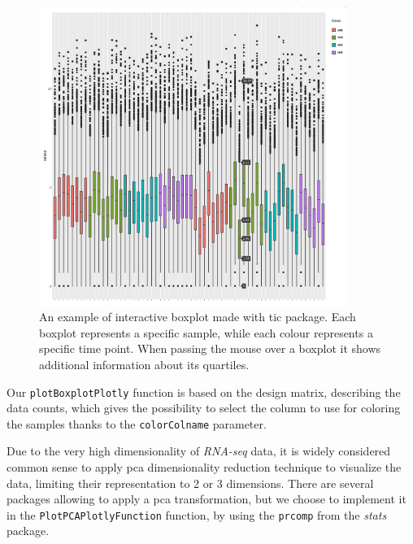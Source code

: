 \begin{figure}[H]
\centering
\includegraphics[width=10cm, keepaspectratio]{img/ticorser/boxplot_example.png}
\caption[ticorser boxplot]{An example of interactive boxplot made with \gls{tic} package. Each boxplot represents a specific sample, while each colour represents a specific time point. When passing the mouse over a boxplot it shows additional information about its quartiles.}
\label{fig:ticorserboxplot}

\end{figure}

Our \lstinline!plotBoxplotPlotly! function is based on the design matrix, describing the data counts, which gives the possibility to select the column to use for coloring the samples thanks to the \lstinline!colorColname! parameter. 

Due to the very high dimensionality of \textit{RNA-seq} data, it is widely considered common sense to apply \gls{pca} dimensionality reduction technique to visualize the data, limiting their representation to 2 or 3 dimensions.
There are several packages allowing to apply a \gls{pca} transformation, but we choose to implement it in the \lstinline!PlotPCAPlotlyFunction! function, by using the \lstinline!prcomp! from the \textit{stats} package.


